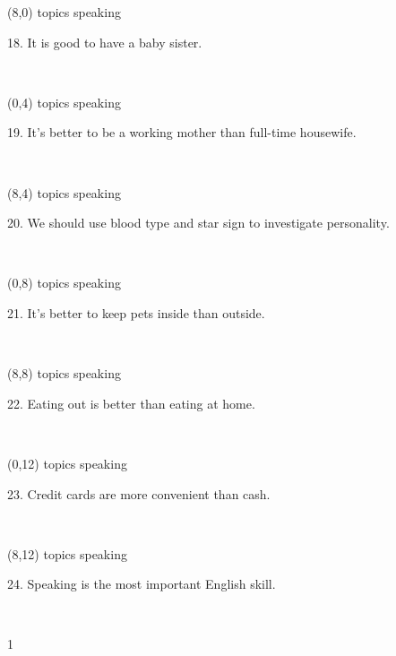 \documentclass[a4paper]{article}
\newcommand{\mycard}[5]{%
	\vspace{0.1cm}
	\small #1 #2
	\par
	\parbox[t][6.7cm][c]{9.5cm}{%
	\hspace{0.1cm} \Large#3\\
	\normalsize#4 #5
	}
}
\begin{document}
\begin{textblock}{8}(8,0)
\mycard{topics}{speaking}{\parbox{9.0cm}{
18. It is good to have a baby sister.
}}{}{} 
\end{textblock}

\begin{textblock}{8}(0,4)
\mycard{topics}{speaking}{\parbox{9.0cm}{
19. It's better to be a working mother than full-time housewife.
}}{}{} 
\end{textblock}

\begin{textblock}{8}(8,4)
\mycard{topics}{speaking}{\parbox{9.0cm}{
20. We should use blood type and star sign to investigate personality.
}}{}{} 
\end{textblock}

\begin{textblock}{8}(0,8)
\mycard{topics}{speaking}{\parbox{9.0cm}{
21. It's better to keep pets inside than outside.
}}{}{} 
\end{textblock}

\begin{textblock}{8}(8,8)
\mycard{topics}{speaking}{\parbox{9.0cm}{
22. Eating out is better than eating at home.
}}{}{} 
\end{textblock}

\begin{textblock}{8}(0,12)
\mycard{topics}{speaking}{\parbox{9.0cm}{
23. Credit cards are more convenient than cash.
}}{}{} 
\end{textblock}

\begin{textblock}{8}(8,12)
\mycard{topics}{speaking}{\parbox{9.0cm}{
24. Speaking is the most important English skill.
}}{}{} 
\end{textblock}

\begin{tiny}1\end{tiny}\\
\newpage
\end{document}
